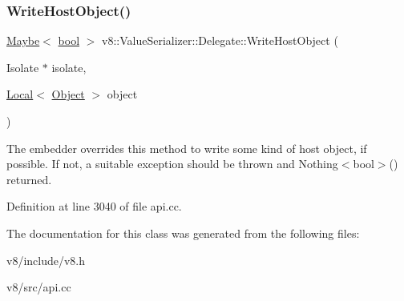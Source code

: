 \subsubsection{\texorpdfstring{Write\+Host\+Object()}{WriteHostObject()}}
{\footnotesize\ttfamily \mbox{\hyperlink{classv8_1_1Maybe}{Maybe}}$<$ \mbox{\hyperlink{classbool}{bool}} $>$ v8\+::\+Value\+Serializer\+::\+Delegate\+::\+Write\+Host\+Object (\begin{DoxyParamCaption}\item[{Isolate $\ast$}]{isolate,  }\item[{\mbox{\hyperlink{classv8_1_1Local}{Local}}$<$ \mbox{\hyperlink{classv8_1_1Object}{Object}} $>$}]{object }\end{DoxyParamCaption})\hspace{0.3cm}{\ttfamily [virtual]}}

The embedder overrides this method to write some kind of host object, if possible. If not, a suitable exception should be thrown and Nothing$<$bool$>$() returned. 

Definition at line 3040 of file api.\+cc.



The documentation for this class was generated from the following files\+:\begin{DoxyCompactItemize}
\item 
v8/include/v8.\+h\item 
v8/src/api.\+cc\end{DoxyCompactItemize}
